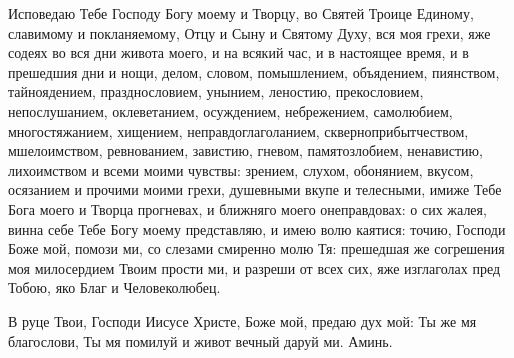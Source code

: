 \begin{mymulticols}

Исповедаю Тебе Господу Богу моему и Творцу, во Святей Троице Единому, славимому и покланяемому, Отцу и Сыну и Святому Духу, вся моя грехи, яже содеях во вся дни живота моего, и на всякий час, и в настоящее время, и в прешедшия дни и нощи, делом, словом, помышлением, объядением, пиянством, тайноядением, празднословием, унынием, леностию, прекословием, непослушанием, оклеветанием, осуждением, небрежением, самолюбием, многостяжанием, хищением, неправдоглаголанием, скверноприбытчеством, мшелоимством, ревнованием, завистию, гневом, памятозлобием, ненавистию, лихоимством и всеми моими чувствы: зрением, слухом, обонянием, вкусом, осязанием и прочими моими грехи, душевными вкупе и телесными, имиже Тебе Бога моего и Творца прогневах, и ближняго моего онеправдовах: о сих жалея, винна себе Тебе Богу моему представляю, и имею волю каятися: точию, Господи Боже мой, помози ми, со слезами смиренно молю Тя: прешедшая же согрешения моя милосердием Твоим прости ми, и разреши от всех сих, яже изглаголах пред Тобою, яко Благ и Человеколюбец.


В руце Твои, Господи Иисусе Христе, Боже мой, предаю дух мой: Ты же мя благослови, Ты мя помилуй и живот вечный даруй ми. Аминь.

\end{mymulticols}

\mychapterending


